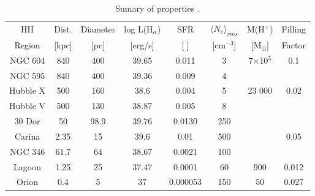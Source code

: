 \documentclass[fleqn,usenatbib, useAMS, a4paper]{mnras}
\begin{document}


\begin{table}
\begin{center}\caption{Sumary of properties \citep{1984ApJ...287..116K}.}
\begin{tabular}{cccccccc}\hline
HII    &  Dist.  & Diameter & log L(H$_{\alpha}$) & SFR      &  $ \langle N_{e} \rangle_{rms}$    & M(H$^{+}$) & Filling  \\
Region     &  [kpc] &  [pc]     &  [erg/s]            & [ ]      & [cm$^{-3}$] & [M$_{\odot}$] & Factor \\ \hline
NGC 604   &   840  & 400     &    39.65     & 0.011    & 3  & 7$\times$10$^{5}$ & 0.1 \\
NGC 595   &   840  & 400     &    39.36     & 0.009    & 4  &  \\
Hubble X  &   500  & 160     &    38.6      &  0.004   &  5 & 23 000& 0.02\\
Hubble V  &   500  & 130     &    38.87     &  0.005   &  8 &    &\\
30 Dor    &   50   & 98.9    &    39.76     & 0.0130   & 250&    &\\
Carina    &   2.35 & 15      &    39.6      & 0.01     & 500&    & 0.05 \\
NGC 346   &   61.7 & 64      &    38.67     & 0.0021   & 100&    &     \\
Lagoon    &   1.25 & 25      &    37.47     & 0.0001   &  60& 900& 0.012\\
Orion     &   0.4  & 5       &    37        & 0.000053 & 150& 50 & 0.027\\

\end{tabular}\label{tab:Reg}
\end{center}
\end{table} 



\end{document}
